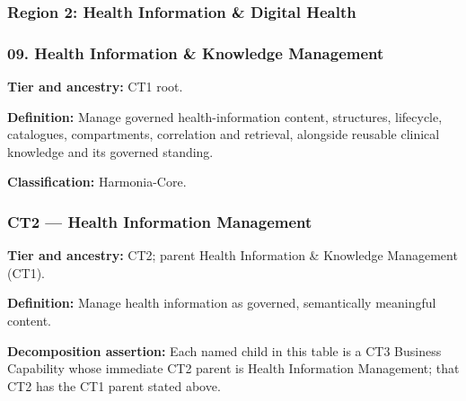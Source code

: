 \par\smallskip
{}\label{rad:business:634}
\subsubsection*{Region 2: Health Information \& Digital Health}
\label{rad:business:636}
\subsubsection*{09. Health Information \& Knowledge Management}
\label{rad:business:638}

\textbf{Tier and ancestry:} CT1 root.

\label{rad:business:640}

\textbf{Definition:} Manage governed health-information content, structures, lifecycle, catalogues, compartments, correlation and retrieval, alongside reusable clinical knowledge and its governed standing.

\label{rad:business:642}

\textbf{Classification:} Harmonia-Core.

\label{rad:business:644}
\subsubsection*{CT2 — Health Information Management}
\label{rad:business:646}

\textbf{Tier and ancestry:} CT2; parent Health Information \& Knowledge Management (CT1).

\label{rad:business:648}

\textbf{Definition:} Manage health information as governed, semantically meaningful content.

\label{rad:business:650}

\textbf{Decomposition assertion:} Each named child in this table is a CT3 Business Capability whose immediate CT2 parent is Health Information Management; that CT2 has the CT1 parent stated above.

